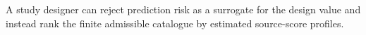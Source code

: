 A study designer can reject prediction risk as a surrogate for the design value and instead rank the finite admissible catalogue by estimated source-score profiles.